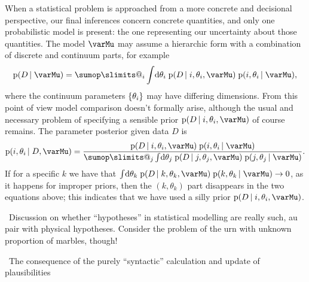 \documentclass[\ifafour a4paper,12pt,\else a5paper,10pt,\fi%
onecolumn,oneside,article,%
british%
]{memoir}
\makeatletter
\theoremstyle{remark}
\theoremstyle{innote}
\def\sum{\DOTSI\sumop\slimits@}
\newcommand*{\di}{\mathrm{d}}%
\DeclarePairedDelimiter\set{\{}{\}}
\newcommand*{\pf}{\mathrm{p}}%
\renewcommand*{\|}{\nonscript\,\vert\nonscript\;\mathopen{}}
\newcommand*{\puzzle}{\maltese}
\newcommand{\mynote}[1]{ {\color{notecolour}\puzzle\ #1}}
\newcommand*{\yM}{\varMu}
\newcommand*{\yD}{D}
\makeatother
\begin{document}
\bigskip

When a statistical problem is approached from a more concrete and
decisional perspective, our final inferences concern concrete quantities,
and only one probabilistic model is present: the one representing our
uncertainty about those quantities. The model $\yM$ may assume a hierarchic form
with a combination of discrete and continuum parts, for example
\begin{equation}
  \label{eq:example_model_mixed}
  \pf(\yD \| \yM) =
 \sum_i \int\!\di\theta_i\; \pf(\yD \| i, \theta_i,\yM)\;
  \pf(i, \theta_i \| \yM),
\end{equation}
where the continuum parameters $\set{\theta_i}$ may have differing
dimensions. From this point of view model comparison doesn't formally
arise, although the usual and necessary problem of specifying a sensible
prior $\pf(\yD \| i, \theta_i,\yM)$ of course remains. The parameter
posterior given data $\yD$ is
\begin{equation}
  \label{eq:param_posterior_model_mixed}
  \pf(i, \theta_i \| \yD, \yM) =
  \frac{\pf(\yD \| i, \theta_i,\yM)\;  \pf(i, \theta_i \| \yM)
  }{
 \sum_j \int\!\di\theta_j\; \pf(\yD \| j, \theta_j,\yM)\;
  \pf(j, \theta_j \| \yM)
  }.
\end{equation}
If for a specific $k$ we have that
$\int\!\di\theta_k\; \pf(\yD \| k, \theta_k,\yM)\; \pf(k, \theta_k \| \yM)
\to 0$, as it happens for improper priors, then the $(k,\theta_k)$ part
disappears in the two equations above; this indicates that we have used a
silly prior $\pf(\yD \| i, \theta_i,\yM)$.




\mynote{Discussion on whether \enquote{hypotheses} in statistical modelling
are really such, au pair with physical hypotheses. Consider the problem of
the urn with unknown proportion of marbles, though!}

\mynote{The consequence of the purely \enquote{syntactic} calculation and
  update of plausibilities}
\end{document}
